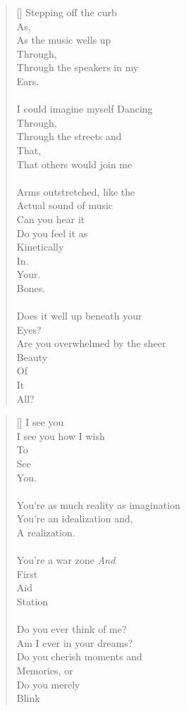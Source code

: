 \documentclass{article}
\begin{document}
\settowidth{\versewidth}{Than Tycho Brahe, or Erra Pater:}
\begin{verse}[\versewidth]
Stepping off the curb \\
As, \\
As the music wells up \\
Through, \\
Through the speakers in my \\
Ears. \\
\\
I could imagine myself Dancing \\
Through, \\
Through the streets and \\
That, \\
That others would join me \\
\\
Arms outstretched, like the \\
Actual sound of music \\
Can you hear it \\
Do you feel it as \\
Kinetically \\
In. \\
Your. \\
Bones. \\
\\
Does it well up beneath your \\
Eyes? \\
Are you overwhelmed by the sheer \\
Beauty \\
Of \\
It \\
All? \\
\end{verse}

\settowidth{\versewidth}{Than Tycho Brahe, or Erra Pater:}
\begin{verse}[\versewidth]
I see you \\
\tab I see you how I wish \\
To \\
See \\
You. \\
\\
You're as much reality as imagination \\
You're an idealization and, \\
A realization. \\
\\
You're a war zone \textit{And} \\
First \\
Aid \\
Station \\
\\
Do you ever think of me? \\
Am I ever in your dreams? \\
Do you cherish moments and \\
Memories, or \\
Do you merely \\
Blink \\
\end{verse}
\end{document}
